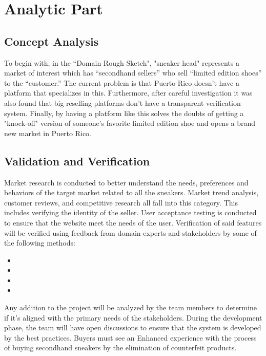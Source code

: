 \chapter{Analytic Part}
\newpage
\section{Concept Analysis}
\hspace{1cm} To begin with, in the “Domain Rough Sketch", 
"sneaker head" represents a market of interest which has “secondhand sellers” who sell “limited edition shoes” to the “customer.” 
The current problem is that Puerto Rico doesn't have a platform that specializes in this. Furthermore, after careful investigation it was also found that big reselling platforms don't have a transparent verification system. Finally, by having a platform like this solves the doubts of getting a "knock-off" version of someone's favorite limited edition shoe and opens a brand new market in Puerto Rico.
\section{Validation and Verification}
\hspace{1cm} 
Market research is conducted to better understand the needs, preferences and behaviors of the target market related to all the sneakers. Market trend analysis, customer reviews, and competitive research all fall into this category.
 This includes verifying the identity of the seller.
User acceptance testing is conducted to ensure that the website meet the needs of the user. Verification of said features will be verified using feedback from domain experts and stakeholders by some of the following methods:
\begin{itemize}
  \item {}
  \item {}
  \item {}
  \item {}
\end{itemize}
Any addition to the project will be analyzed by the team members to determine if it’s aligned with the primary needs of the stakeholders. During the development phase, the team will have open discussions to ensure that the system is developed by the best practices. Buyers must see an Enhanced experience with the process of buying secondhand sneakers by the elimination of counterfeit products.
